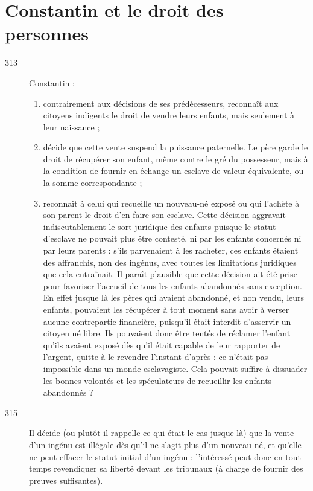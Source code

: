 
\chapter{Constantin et le droit des personnes}


\begin{description}
\item[313] Constantin :
 \begin{enumerate}[leftmargin=*,itemsep=0pt]
\item contrairement aux décisions de ses prédécesseurs, reconnaît aux citoyens indigents le droit de vendre leurs enfants, mais seulement à leur naissance ; 
\item décide que cette vente suspend la puissance paternelle. Le père garde le droit de récupérer son enfant, même contre le gré du possesseur, mais à la condition de fournir en échange un esclave de valeur équivalente, ou la somme correspondante ; 
\item reconnaît à celui qui recueille un nouveau-né exposé ou qui l'achète à son parent le droit d'en faire son esclave. Cette décision aggravait indiscutablement le sort juridique des enfants puisque le statut d'esclave ne pouvait plus être contesté, ni par les enfants concernés ni par leurs parents : s'ils parvenaient à les racheter, ces enfants étaient des affranchis, non des ingénus, avec toutes les limitations juridiques que cela entraînait. Il paraît plausible que cette décision ait été prise pour favoriser l'accueil de tous les enfants abandonnés sans exception. En effet jusque là les pères qui avaient abandonné, et non vendu, leurs enfants, pouvaient les récupérer à tout moment sans avoir à verser aucune contrepartie financière, puisqu'il était interdit d'asservir un citoyen né libre. Ils pouvaient donc être tentés de réclamer l'enfant qu'ils avaient exposé dès qu'il était capable de leur rapporter de l'argent, quitte à le revendre l'instant d'après : ce n'était pas impossible dans un monde esclavagiste. Cela pouvait suffire à dissuader les bonnes volontés et les spéculateurs de recueillir les enfants abandonnés ? 
\end{enumerate}
 
\item[315] Il décide (ou plutôt il rappelle ce qui était le cas jusque là) que la vente d'un ingénu est illégale dès qu'il ne s'agit plus d'un nouveau-né, et qu'elle ne peut effacer le statut initial d'un ingénu : l'intéressé peut donc en tout temps revendiquer sa liberté devant les tribunaux (à charge de fournir des preuves suffisantes).


\end{description}
